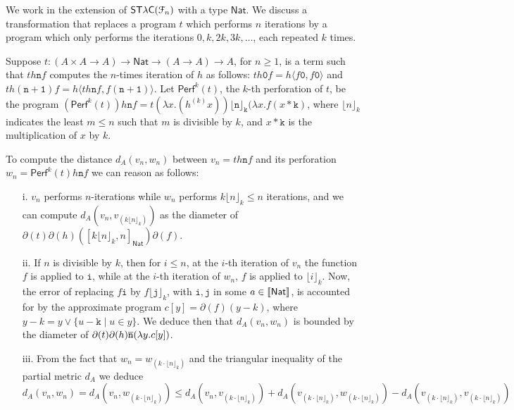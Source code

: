 \begin{example}
We work in the extension of $\mathsf{ST\lambda C}(\mathcal F_{n})$ with a type $\mathsf{Nat}$.
We discuss a transformation that replaces a program $t$ which performs $n$ iterations by a program which only performs the iterations $0,k,2k,3k,\dots$, each repeated $k$ times. 

Suppose  $t: (A\times A\to A) \to \mathsf{Nat}\to (A\to A)\to A$, for $n\geq 1$, is a term such that $th\mathtt n f$ 
computes the $n$-times iteration of $h$ as follows: $th \mathtt 0f= h\langle f\mathtt 0, f\mathtt 0\rangle$ and $th(\mathtt{n+1})f=h\langle th\mathtt n f, f(\mathtt{n+1})\rangle$. 
Let $\mathsf{Perf}^{k}(t)$, the $k$-th perforation of $t$, be the program   
$(\mathsf{Perf}^{k}(t))h\mathtt nf= t(\lambda x. (h^{(k)}x)) \mathtt{\lfloor n\rfloor_{k}} (\lambda x. f(x* \mathtt k)$, where $\lfloor n\rfloor_{k}$ indicates the least $m\leq n$ such that $m$ is divisible by $k$, and $x*\mathtt k$ is the multiplication of $x$ by $k$. 





To compute the distance 
$d_{A}(v_{n},w_{n}    )$ between  $v_{n}=th\mathtt n f $ and its perforation $w_{n}=\mathsf{Perf}^{k}(t)h\mathtt nf$  we can reason as follows: 
\begin{itemize}

\item[i.] $v_{n}$ performs $n$-iterations while $w_{n}$ performs $k\lfloor n\rfloor_{k}  \leq n$ iterations, and we can compute  
$d_{A}(v_{n}, v_{(k \lfloor n\rfloor_{k})})$ as the diameter of 
$\partial(t)\partial(h)([ k \lfloor n\rfloor_{k}, n]_{\mathsf{Nat}}) \partial(f)$.




\item[ii.] If $n$ is divisible by $k$, then for $i\leq n$, at the $i$-th iteration of $v_{n}$ the function $f$ is applied  to $\mathtt i$, while at the $i$-th iteration of $w_{n}$, $f$ is applied to $\lfloor i\rfloor_{k}$. Now, the error of replacing  $f\mathtt i$ by $ f\lfloor \mathtt j\rfloor_{k}$, with $\mathtt i,\mathtt j$ in some $a\in \llbracket \mathsf{Nat} \rrbracket$, is accounted for by the approximate program $c[y]= \partial(f)(y-k  )$, where $y-k= y \vee \{u-\mathtt k\mid u \in y\}$.
We deduce then that 
$d_{A}(v_{n}, w_{n})$ is bounded by the diameter of $\partial(t)\partial(h)\overline{\mathtt n} (\lambda y.c[y])$.

\item[iii.] From the fact that $w_{n}=w_{(k\cdot \lfloor n\rfloor_{k})}$ and the triangular inequality of the partial metric $d_{A}$ we deduce  
$d_{A}(v_{n}, w_{n})=
d_{A}(v_{n},w_{(k\cdot \lfloor n\rfloor_{k})}) \leq
d_{A}(v_{n}, v_{(k\cdot \lfloor n\rfloor_{k})})+
d_{A}(v_{(k\cdot \lfloor n\rfloor_{k})}, w_{(k\cdot \lfloor n\rfloor_{k})})-
d_{A}(v_{(k\cdot \lfloor n\rfloor_{k})},v_{(k\cdot \lfloor n\rfloor_{k})} )$



\end{itemize}
\end{example}
